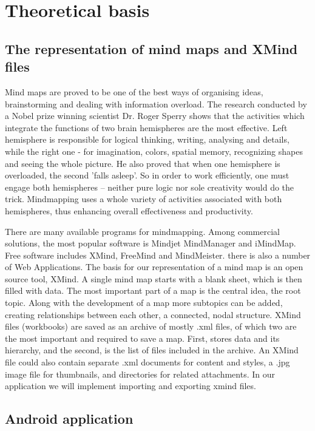 \chapter{Theoretical basis}
\label{chap:theory}

\section{The representation of mind maps and XMind files}
\label{sec:xmind}


Mind maps are proved to be one of the best ways of organising ideas, brainstorming and dealing with information overload. The research conducted by a Nobel prize winning scientist Dr. Roger Sperry shows that the activities which integrate the functions of two brain hemispheres are the most effective. Left hemisphere is responsible for logical thinking, writing, analysing and details, while the right one - for imagination, colors, spatial memory, recognizing shapes and seeing the whole picture. He also proved that when one hemisphere is overloaded, the second 'falls asleep'. So in order to work efficiently, one must engage both hemispheres -- neither pure logic nor sole creativity would do the trick. Mindmapping uses a whole variety of activities associated with both hemispheres, thus enhancing overall effectiveness and productivity.

There are many available programs for mindmapping. Among commercial solutions, the most popular software is Mindjet MindManager and iMindMap. Free software includes XMind, FreeMind and MindMeister. there is also a number of Web Applications. The basis for our representation of a mind map is an open source tool, XMind. A single mind map starts with a blank sheet, which is then filled with data. The most important part of a map is the central idea, the root topic.  Along with the development of a map more subtopics can be added, creating relationships between each other, a connected, nodal structure. XMind files (workbooks) are saved as an archive of mostly .xml files, of which two are the most important and required to save a map. First,  stores data and its hierarchy, and the second,  is the list of files included in the archive. An XMind file could also contain separate .xml documents for content and styles, a .jpg image file for thumbnails, and directories for related attachments. In our application we will implement importing and exporting xmind files.

\section{Android application}
\label{androidsdk}


